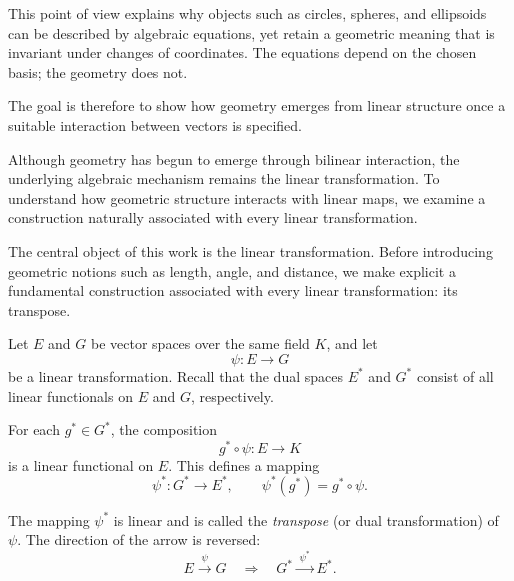 \medskip

This point of view explains why objects such as circles, spheres, and ellipsoids
can be described by algebraic equations, yet retain a geometric meaning that is
invariant under changes of coordinates.
The equations depend on the chosen basis; the geometry does not.

\medskip

The goal is therefore to show how geometry emerges from linear structure once a
suitable interaction between vectors is specified.

\medskip


Although geometry has begun to emerge through bilinear interaction, the
underlying algebraic mechanism remains the linear transformation.
To understand how geometric structure interacts with linear maps, we examine a
construction naturally associated with every linear transformation.

\medskip

The central object of this work is the linear transformation. Before introducing
geometric notions such as length, angle, and distance, we make explicit a
fundamental construction associated with every linear transformation: its
transpose.

\medskip

Let $E$ and $G$ be vector spaces over the same field $K$, and let
\[
\psi : E \longrightarrow G
\]
be a linear transformation. Recall that the dual spaces $E^*$ and $G^*$ consist
of all linear functionals on $E$ and $G$, respectively.

\medskip

For each $g^* \in G^*$, the composition
\[
g^* \circ \psi : E \longrightarrow K
\]
is a linear functional on $E$. This defines a mapping
\[
\psi^* : G^* \longrightarrow E^*,
\qquad
\psi^*(g^*) = g^* \circ \psi.
\]

\medskip

The mapping $\psi^*$ is linear and is called the \emph{transpose}
(or dual transformation) of $\psi$. The direction of the arrow is reversed:
\[
E \xrightarrow{\;\psi\;} G
\quad\Longrightarrow\quad
G^* \xrightarrow{\;\psi^*\;} E^*.
\]

